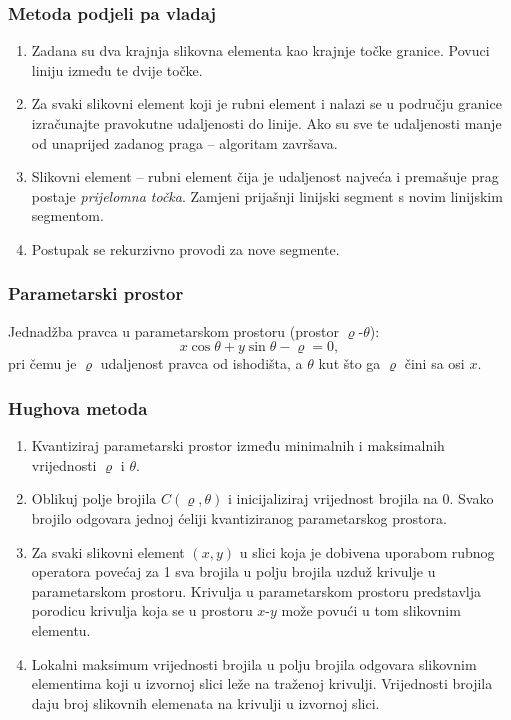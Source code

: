 \documentclass[11pt,english]{article}
\begin{document}
\subsubsection{Metoda podjeli pa vladaj}
\begin{enumerate}
  \item Zadana su dva krajnja slikovna elementa kao krajnje točke granice. Povuci liniju između te dvije točke.
  \item Za svaki slikovni element koji je rubni element i nalazi se u području granice izračunajte pravokutne udaljenosti do linije. Ako su sve te udaljenosti manje od unaprijed zadanog praga -- algoritam završava.
  \item Slikovni element -- rubni element čija je udaljenost najveća i premašuje prag postaje \emph{prijelomna točka}. Zamjeni prijašnji linijski segment s novim linijskim segmentom.
  \item Postupak se rekurzivno provodi za nove segmente.
\end{enumerate}

\subsubsection{Parametarski prostor}
Jednadžba pravca u parametarskom prostoru (prostor $\varrho$-$\theta$):
$$x\cos \theta + y \sin \theta - \varrho = 0,$$
pri čemu je $\varrho$ udaljenost pravca od ishodišta, a $\theta$ kut što ga $\varrho$ čini sa osi $x$.

\subsubsection{Hughova metoda}
\begin{enumerate}
  \item Kvantiziraj parametarski prostor između minimalnih i maksimalnih vrijednosti $\varrho$ i $\theta$.
  \item Oblikuj polje brojila $C(\varrho,\theta)$ i inicijaliziraj vrijednost brojila na 0. Svako brojilo odgovara jednoj ćeliji kvantiziranog parametarskog prostora.
  \item Za svaki slikovni element $(x,y)$ u slici koja je dobivena uporabom rubnog operatora povećaj za 1 sva brojila u polju brojila uzduž krivulje u parametarskom prostoru. Krivulja u parametarskom prostoru predstavlja porodicu krivulja koja se u prostoru $x$-$y$ može povući u tom slikovnim elementu.
  \item Lokalni maksimum vrijednosti brojila u polju brojila odgovara slikovnim elementima koji u izvornoj slici leže na traženoj krivulji. Vrijednosti brojila daju broj slikovnih elemenata na krivulji u izvornoj slici.
\end{enumerate}
\end{document}
